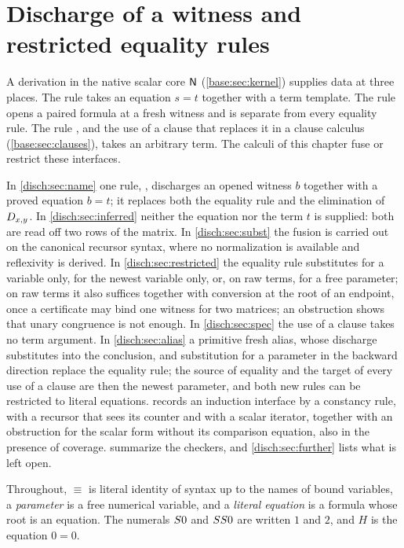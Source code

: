 \chapter{Discharge of a witness and restricted equality rules}
\label{prov:ch:disch}
\label{disch:chap}

A derivation in the native scalar core $\mathsf{N}$ (\cref{base:sec:kernel})
supplies data at three places. The rule  takes an equation
$s=t$ together with a term template. The rule  opens a paired
formula at a fresh witness and is separate from every equality rule. The
rule , and the use of a clause that replaces it in a clause
calculus (\cref{base:sec:clauses}), takes an arbitrary term. The calculi of
this chapter fuse or restrict these interfaces.

In \cref{disch:sec:name} one rule, , discharges an opened
witness $b$ together with a proved equation $b=t$; it replaces both the
equality rule and the elimination of $D_{x,y}$. In
\cref{disch:sec:inferred} neither the equation nor the term $t$ is
supplied: both are read off two rows of the matrix. In
\cref{disch:sec:subst} the fusion is carried out on the canonical recursor
syntax, where no normalization is available and reflexivity is derived. In
\cref{disch:sec:restricted} the equality rule substitutes for a variable
only, for the newest variable only, or, on raw terms, for a free parameter;
on raw terms it also suffices together with conversion at the root of an
endpoint, once a certificate may bind one witness for two matrices; an
obstruction shows that unary congruence is not enough. In
\cref{disch:sec:spec} the use of a clause takes no term argument. In
\cref{disch:sec:alias} a primitive fresh alias, whose discharge substitutes
into the conclusion, and substitution for a parameter in the backward
direction replace the equality rule; the source of equality and the target
of every use of a clause are then the newest parameter, and both new rules
can be restricted to literal equations.  records an induction interface by a
constancy rule, with a recursor that sees its counter and with a scalar
iterator, together with an obstruction for the scalar form without its
comparison equation, also in the presence of coverage.
 summarize
the checkers, and \cref{disch:sec:further} lists what is left open.

Throughout, $\equiv$ is literal identity of syntax up to the names of bound
variables, a \emph{parameter} is a free numerical variable, and a
\emph{literal equation} is a formula whose root is an equation. The numerals
$S 0$ and $SS 0$ are written $1$ and $2$, and $H$ is the equation
$0=0$.

